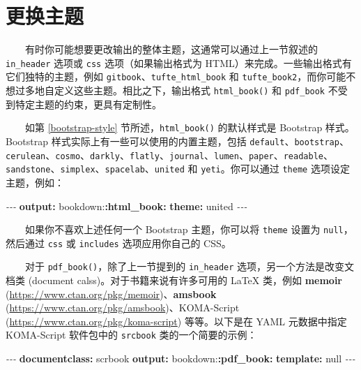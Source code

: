 \documentclass[
  12pt,
]{krantz}
\newenvironment{Shaded}{\begin{snugshade}}{\end{snugshade}}
\newcommand{\AttributeTok}[1]{\textcolor[rgb]{0.13,0.29,0.53}{#1}}
\newcommand{\CharTok}[1]{\textcolor[rgb]{0.31,0.60,0.02}{#1}}
\newcommand{\FunctionTok}[1]{\textcolor[rgb]{0.13,0.29,0.53}{\textbf{#1}}}
\newcommand{\KeywordTok}[1]{\textcolor[rgb]{0.13,0.29,0.53}{\textbf{#1}}}
\newcommand{\PreprocessorTok}[1]{\textcolor[rgb]{0.56,0.35,0.01}{\textit{#1}}}
\theoremstyle{definition}
\theoremstyle{definition}
\theoremstyle{definition}
\theoremstyle{definition}
\theoremstyle{remark}
\begin{document}
\hypertarget{ux66f4ux6362ux4e3bux9898}{%
\section{更换主题}\label{ux66f4ux6362ux4e3bux9898}}

  有时你可能想要更改输出的整体主题，这通常可以通过上一节叙述的 \texttt{in\_header} 选项或 \texttt{css} 选项（如果输出格式为 HTML）来完成。一些输出格式有它们独特的主题，例如 \texttt{gitbook}、\texttt{tufte\_html\_book} 和 \texttt{tufte\_book2}，而你可能不想过多地自定义这些主题。相比之下，输出格式 \texttt{html\_book()} 和 \texttt{pdf\_book} 不受到特定主题的约束，更具有定制性。

  如第 \ref{bootstrap-style} 节所述，\texttt{html\_book()} 的默认样式是 Bootstrap 样式。Bootstrap 样式实际上有一些可以使用的内置主题，包括 \texttt{default}、\texttt{bootstrap}、\texttt{cerulean}、\texttt{cosmo}、\texttt{darkly}、\texttt{flatly}、\texttt{journal}、\texttt{lumen}、\texttt{paper}、\texttt{readable}、\texttt{sandstone}、\texttt{simplex}、\texttt{spacelab}、\texttt{united} 和 \texttt{yeti}。你可以通过 \texttt{theme} 选项设定主题，例如：

\begin{Shaded}
\begin{Highlighting}[]
\PreprocessorTok{{-}{-}{-}}
\FunctionTok{output}\KeywordTok{:}
\AttributeTok{  bookdown:}\FunctionTok{:html\_book}\KeywordTok{:}
\AttributeTok{    }\FunctionTok{theme}\KeywordTok{:}\AttributeTok{ united}
\PreprocessorTok{{-}{-}{-}}
\end{Highlighting}
\end{Shaded}

  如果你不喜欢上述任何一个 Bootstrap 主题，你可以将 \texttt{theme} 设置为 \texttt{null}，然后通过 \texttt{css} 或 \texttt{includes} 选项应用你自己的 CSS。

  对于 \texttt{pdf\_book()}，除了上一节提到的 \texttt{in\_header} 选项，另一个方法是改变文档类 (document calss)。对于书籍来说有许多可用的 LaTeX 类，例如 \textbf{memoir} (\url{https://www.ctan.org/pkg/memoir})、\textbf{amsbook} (\url{https://www.ctan.org/pkg/amsbook})、KOMA-Script (\url{https://www.ctan.org/pkg/koma-script}) 等等。以下是在 YAML 元数据中指定 KOMA-Script 软件包中的 \texttt{srcbook} 类的一个简要的示例：

\begin{Shaded}
\begin{Highlighting}[]
\PreprocessorTok{{-}{-}{-}}
\FunctionTok{documentclass}\KeywordTok{:}\AttributeTok{ scrbook}
\FunctionTok{output}\KeywordTok{:}
\AttributeTok{  bookdown:}\FunctionTok{:pdf\_book}\KeywordTok{:}
\AttributeTok{    }\FunctionTok{template}\KeywordTok{:}\AttributeTok{ }\CharTok{null}
\PreprocessorTok{{-}{-}{-}}
\end{Highlighting}
\end{Shaded}
\end{document}
